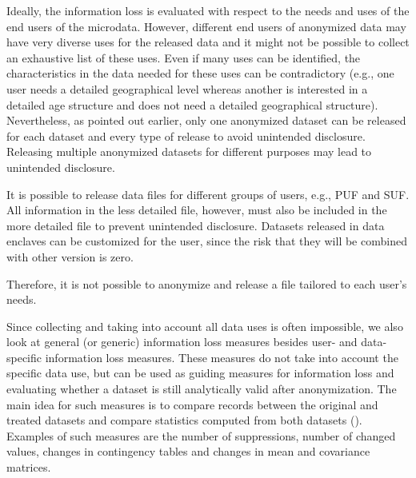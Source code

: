 \documentclass[letterpaper,10pt,english]{sphinxmanual}
\begin{document}
Ideally, the information loss is evaluated with respect to the needs and
uses of the end users of the microdata. However, different end users of
anonymized data may have very diverse uses for the released data and it
might not be possible to collect an exhaustive list of these uses. Even
if many uses can be identified, the characteristics in the data needed
for these uses can be contradictory (e.g., one user needs a detailed
geographical level whereas another is interested in a detailed age
structure and does not need a detailed geographical structure).
Nevertheless, as pointed out earlier, only one anonymized dataset can be
released for each dataset and every type of release to avoid unintended
disclosure. Releasing multiple anonymized datasets for different
purposes may lead to unintended disclosure. %
\begin{footnote}[1]\sphinxAtStartFootnote
It is possible to release data files for different groups of users,
e.g., PUF and SUF. All information in the less detailed file,
however, must also be included in the more detailed file to prevent
unintended disclosure. Datasets released in data enclaves can be
customized for the user, since the risk that they will be combined
with other version is zero.
%
\end{footnote}
Therefore, it is not possible to anonymize and release a file tailored
to each user’s needs.

Since collecting and taking into account all data uses is often
impossible, we also look at general (or generic) information loss
measures besides user- and data-specific information loss measures.
These measures do not take into account the specific data use, but can
be used as guiding measures for information loss and evaluating whether
a dataset is still analytically valid after anonymization. The main idea
for such measures is to compare records between the original and treated
datasets and compare statistics computed from both datasets ({\hyperref[\detokenize{utility:hdfg12}]{}}).
Examples of such measures are the number of suppressions,
number of changed values, changes in contingency tables and changes in
mean and covariance matrices.
\end{document}

